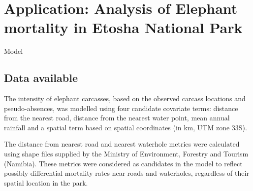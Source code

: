 \documentclass[letterpaper, 12pt]{interact}
\begin{document}
	
	\clearpage
	
	\section*{Application: Analysis of Elephant mortality in Etosha National Park}\label{analysis-of-elephant-mortality-in-etosha-national-park}
	Model
	\subsection*{Data available}\label{data-available}
	
	The intensity of elephant carcasses, based on the observed carcass locations and pseudo-absences, was modelled using four candidate covariate terms: distance from the nearest road, distance from the nearest water point, mean annual rainfall and a spatial term based on spatial coordinates (in km, UTM zone 33S).
	
	The distance from nearest road and nearest waterhole metrics were calculated using shape files supplied by the Ministry of Environment, Forestry and Tourism (Namibia). These metrics were considered as candidates in the model to reflect possibly differential mortality rates near roads and waterholes, regardless of their spatial location in the park. 
	
\end{document}
